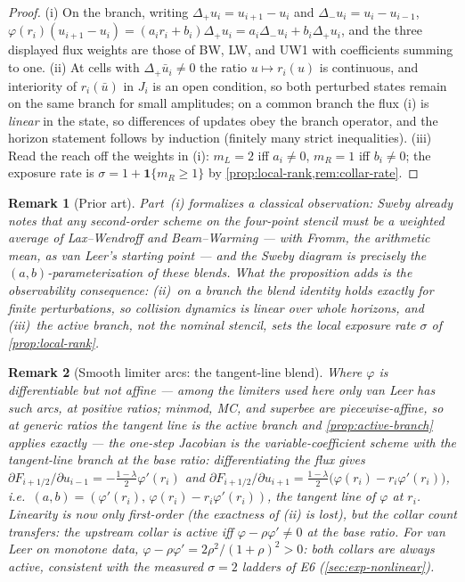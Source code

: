 \documentclass[pdflatex,sn-mathphys-num]{sn-jnl}%
\theoremstyle{thmstyleone}%
\theoremstyle{thmstyletwo}%
\newtheorem{remark}{Remark}%
\theoremstyle{thmstylethree}%
\begin{document}
\begin{proof}
(i) On the branch, writing $\Delta_+u_i=u_{i+1}-u_i$ and $\Delta_-u_i=u_i-u_{i-1}$, $\varphi(r_i)(u_{i+1}-u_i)=(a_ir_i+b_i)\Delta_+u_i =a_i\Delta_-u_i+b_i\Delta_+u_i$, and the three displayed flux weights are those of BW, LW, and UW1 with coefficients summing to one.
(ii) At cells with $\Delta_+\bar u_i\ne0$ the ratio $u\mapsto r_i(u)$ is continuous, and interiority of $r_i(\bar u)$ in $J_i$ is an open condition, so both perturbed states remain on the same branch for small amplitudes; on a common branch the flux (i) is \emph{linear} in the state, so differences of updates obey the branch operator, and the horizon statement follows by induction (finitely many strict inequalities).
(iii) Read the reach off the weights in (i): $m_L=2$ iff $a_i\ne0$, $m_R=1$ iff $b_i\ne0$; the exposure rate is $\sigma=1+\mathbf 1\{m_R\ge1\}$ by \cref{prop:local-rank,rem:collar-rate}.
\end{proof}

\begin{remark}[Prior art]\label{rem:sweby-blend}
Part~(i) formalizes a classical observation: Sweby \cite{Sweby1984} already notes that any second-order scheme on the four-point stencil must be a weighted average of Lax--Wendroff and Beam--Warming --- with Fromm, the arithmetic mean, as van Leer's starting point --- and the Sweby diagram is precisely the $(a,b)$-parameterization of these blends.
What the proposition adds is the observability consequence: (ii)~on a branch the blend identity holds \emph{exactly} for finite perturbations, so collision dynamics is linear over whole horizons, and (iii)~the active branch, not the nominal stencil, sets the local exposure rate $\sigma$ of \cref{prop:local-rank}.
\end{remark}

\begin{remark}[Smooth limiter arcs: the tangent-line blend]\label{rem:tangent-blend}
Where $\varphi$ is differentiable but not affine --- among the limiters used here only van Leer has such arcs, at positive ratios; minmod, MC, and superbee are piecewise-affine, so at generic ratios the tangent line \emph{is} the active branch and \cref{prop:active-branch} applies exactly --- the one-step Jacobian is the variable-coefficient scheme with the \emph{tangent-line} branch at the base ratio: differentiating the flux gives $\partial F_{i+1/2}/\partial u_{i-1}=-\tfrac{1-\lambda}2\varphi'(r_i)$ and $\partial F_{i+1/2}/\partial u_{i+1} =\tfrac{1-\lambda}2\bigl(\varphi(r_i)-r_i\varphi'(r_i)\bigr)$, i.e.\ $(a,b)=(\varphi'(r_i),\,\varphi(r_i)-r_i\varphi'(r_i))$, the tangent line of $\varphi$ at $r_i$.
Linearity is now only first-order (the exactness of (ii) is lost), but the collar count transfers: the upstream collar is active iff $\varphi-\rho\varphi'\ne0$ at the base ratio.
For van Leer on monotone data, $\varphi-\rho\varphi'=2\rho^2/(1+\rho)^2>0$: both collars are always active, consistent with the measured $\sigma=2$ ladders of E6 (\cref{sec:exp-nonlinear}).
\end{remark}
\end{document}
